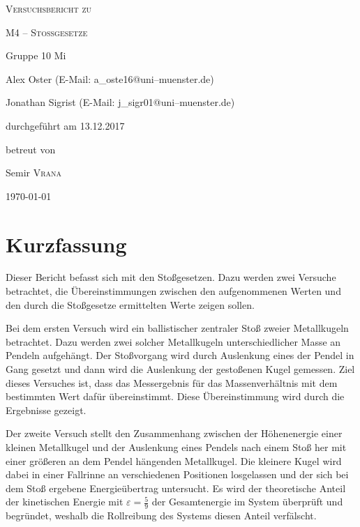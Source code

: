 \documentclass[11pt,a4paper,titlepage, ngerman]{article}
\begin{document}
	\begin{titlepage}
		\centering
		{\scshape\LARGE Versuchsbericht zu \par}
		\vspace{1cm}
		{\scshape\huge M4 -- Stoßgesetze\par}
		\vspace{2.5cm}
		{\LARGE Gruppe 10 Mi\par}
		\vspace{0.5cm}
		{\large Alex Oster (E-Mail: a\_oste16@uni--muenster.de) \par}
		{\large Jonathan Sigrist (E-Mail: j\_sigr01@uni--muenster.de) \par}
		\vfill
		durchgeführt am 13.12.2017\par
		betreut von\par
		{\large Semir \textsc{Vrana}} 
		\vfill	
		{\large \today\par}
	\end{titlepage}
	
	\tableofcontents
	
	\newpage
	
	\section{Kurzfassung}
	
		Dieser Bericht befasst sich mit den Stoßgesetzen. Dazu werden zwei Versuche betrachtet, die Übereinstimmungen zwischen den aufgenommenen Werten und den durch die Stoßgesetze ermittelten Werte zeigen sollen.   
		
		Bei dem ersten Versuch wird ein ballistischer zentraler Stoß zweier Metallkugeln betrachtet. Dazu werden zwei solcher Metallkugeln unterschiedlicher Masse an Pendeln aufgehängt. Der Stoßvorgang wird durch Auslenkung eines der Pendel in Gang gesetzt und dann wird die Auslenkung der gestoßenen Kugel gemessen. Ziel dieses Versuches ist, dass das Messergebnis für das Massenverhältnis mit dem bestimmten Wert dafür übereinstimmt. Diese Übereinstimmung wird durch die Ergebnisse gezeigt.
		
		Der zweite Versuch stellt den Zusammenhang zwischen der Höhenenergie einer kleinen Metallkugel und der Auslenkung eines Pendels nach einem Stoß her mit einer größeren an dem Pendel hängenden Metallkugel.
		Die kleinere Kugel wird dabei in einer Fallrinne an verschiedenen Positionen losgelassen und der sich bei dem Stoß ergebene Energieübertrag  untersucht.
		Es wird der theoretische Anteil der kinetischen Energie mit $\varepsilon = \frac{5}{9}$ der Gesamtenergie im System überprüft und begründet, weshalb die Rollreibung des Systems diesen Anteil verfälscht.
			
\end{document}
